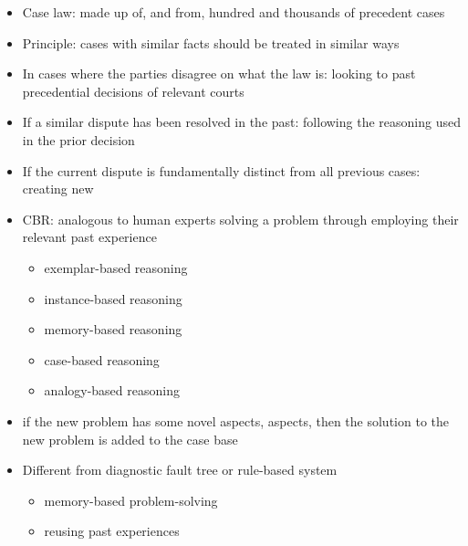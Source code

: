 \begin{itemize}
\item Case law: made up of, and from, hundred and thousands of precedent cases
\item Principle: cases with similar facts should be treated in similar ways 
\item In cases where the parties disagree on what the law is: looking to past precedential decisions of relevant courts
\item If a similar dispute has been resolved in the past: following the reasoning used in the prior decision
\item If the current dispute is fundamentally distinct from all previous cases: creating new 
\item CBR: analogous to human experts solving a problem through employing their relevant past experience
\begin{itemize}
\item exemplar-based reasoning
\item instance-based reasoning
\item memory-based reasoning
\item case-based reasoning
\item analogy-based reasoning
\end{itemize}
\item if the new problem has some novel aspects, aspects, then the solution to the new problem is added to the case base
\item Different from diagnostic fault tree or rule-based system
\begin{itemize}
\item memory-based problem-solving
\item reusing past experiences
\end{itemize}
\end{itemize}

